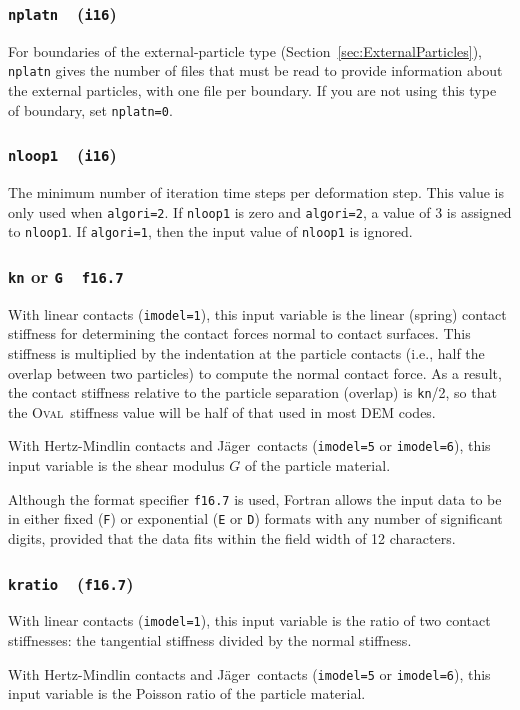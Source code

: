 \documentclass[letterpaper,11pt]{article}
\newcommand{\Oval}{\textsc{Oval}}
\newcommand{\Var}[2]{\texttt{#1}\ \  (\texttt{#2})}
\begin{document}
\subsubsection[\texttt{nplatn}]{\Var{nplatn}{i16}}\label{sec:nplatn}
For boundaries of the external-particle type 
(Section~\ref{sec:ExternalParticles}), \texttt{nplatn} gives the number
of files that must be read to provide information about the external
particles, with one file per boundary.
If you are not using this type of boundary, set \texttt{nplatn=0}.
%
\subsubsection[\texttt{nloop1}]{\Var{nloop1}{i16}}\label{sec:nloop1}
The minimum number of iteration time steps per deformation step.  
This value is only used when \texttt{algori=2}.  If \texttt{nloop1}
is zero and \texttt{algori=2}, a value of 3 is assigned to \texttt{nloop1}.
If \texttt{algori=1}, then the input value of \texttt{nloop1} is ignored.
%
\subsubsection[\texttt{kn} or \texttt{G}]{\texttt{kn} or \texttt{G}\ \ \texttt{f16.7}}\label{sec:kn}
With linear contacts (\texttt{imodel=1}), this input variable is
the linear (spring) contact stiffness for determining the contact
forces normal to 
contact surfaces.
This stiffness is multiplied by the indentation at the particle contacts
(i.e., half the overlap between two particles) to compute the
normal contact force.
As a result, the contact stiffness relative to the particle
separation (overlap) is \texttt{kn}/2, so that the \Oval\ stiffness value
will be half of that used in most DEM codes.
\par
With Hertz-Mindlin contacts and J\"{a}ger\ contacts 
(\texttt{imodel=5} or \texttt{imodel=6}), this input variable is
the shear modulus $G$ of the particle material.
\par
Although the format specifier \texttt{f16.7} is used, Fortran allows 
the input data to be in either fixed (\texttt{F}) or
exponential (\texttt{E} or \texttt{D}) formats with any number
of significant digits, provided that the data fits within the field
width of 12 characters.
%
\subsubsection[\texttt{kratio}]{\Var{kratio}{f16.7}}\label{sec:kratio}
With linear contacts (\texttt{imodel=1}), this input variable is
the ratio of two contact stiffnesses:  the tangential stiffness divided
by the normal stiffness.
\par
With Hertz-Mindlin contacts and J\"{a}ger\ contacts
(\texttt{imodel=5} or \texttt{imodel=6}), 
this input variable is the Poisson ratio of the particle material.
%
\end{document}
